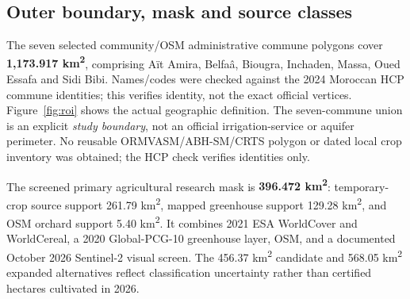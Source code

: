 \documentclass[10pt,a4paper]{article}
\begin{document}
\subsection{Outer boundary, mask and source classes}
The seven selected community/OSM administrative commune polygons cover \textbf{1,173.917 km\textsuperscript{2}}, comprising A\"it Amira, Belfa\^a, Biougra, Inchaden, Massa, Oued Essafa and Sidi Bibi. Names/codes were checked against the 2024 Moroccan HCP commune identities; this verifies identity, not the exact official vertices. Figure~\ref{fig:roi} shows the actual geographic definition. The seven-commune union is an explicit \emph{study boundary}, not an official irrigation-service or aquifer perimeter. No reusable ORMVASM/ABH-SM/CRTS polygon or dated local crop inventory was obtained; the HCP check verifies identities only.

The screened primary agricultural research mask is \textbf{396.472 km\textsuperscript{2}}: temporary-crop source support 261.79 km\textsuperscript{2}, mapped greenhouse support 129.28 km\textsuperscript{2}, and OSM orchard support 5.40 km\textsuperscript{2}. It combines 2021 ESA WorldCover and WorldCereal, a 2020 Global-PCG-10 greenhouse layer, OSM, and a documented October 2026 Sentinel-2 visual screen. The 456.37 km\textsuperscript{2} candidate and 568.05 km\textsuperscript{2} expanded alternatives reflect classification uncertainty rather than certified hectares cultivated in 2026.
\end{document}
